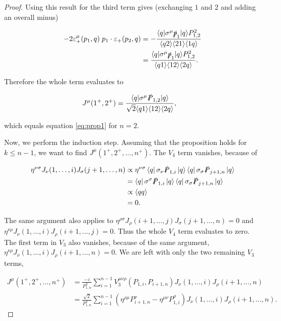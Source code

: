 \documentclass{article}
\theoremstyle{definition}
\numberwithin{equation}{section}
\begin{document}
\begin{proof}
    Using this result for the third term gives (exchanging $1$ and $2$ and adding an overall minus)

    \begin{align*}
        - 2 \varepsilon_{+}^{\mu}(p_1,q) \; p_1 \cdot \varepsilon_{+}(p_2,q) &= -\frac{\langle q | \sigma^{\mu} \slashed{p}_1 | q \rangle P_{1,2}^2}{\langle q2 \rangle \langle 21 \rangle \langle 1q \rangle} \\
        &= \frac{\langle q | \sigma^{\mu} \slashed{p}_1 | q \rangle P_{1,2}^2}{\langle q1 \rangle \langle 12 \rangle \langle 2q \rangle}.
    \end{align*}

    Therefore the whole term evaluates to

    \begin{align*}
        J^{\mu}(1^{+}, 2^{+}) &= \frac{ \langle q | \sigma^{\mu} \slashed{P}_{1,2} | q \rangle }{ \sqrt{2} \langle q1 \rangle \langle 12 \rangle \langle 2q \rangle },
    \end{align*}

    which equals equation \eqref{eq:prop1} for $n=2$.

    Now, we perform the induction step. Assuming that the proposition holds for $k \leq n-1$, we want to find $J^{\mu}(1^{+}, 2^{+}, \dots , n^{+})$. The $V_4$ term vanishes, because of

    \begin{align*}
        \eta^{\nu \sigma} J_{\nu}(1, \dots, i) J_{\sigma}(j+1, \dots, n)
        &\propto \eta^{\nu \sigma} \bra{q} \sigma_{\nu} \slashed{P}_{1,i} \ket{q} \bra{q} \sigma_{\sigma} \slashed{P}_{j+1,n} \ket{q} \\
        &= \bra{q} \sigma^{\sigma} \slashed{P}_{1,i} \ket{q} \bra{q} \sigma_{\sigma} \slashed{P}_{j+1,n} \ket{q} \\
        &\propto  \langle qq \rangle \\
        &= 0.
    \end{align*}

    The same argument also applies to $\eta^{\rho \sigma} J_{\rho}(i+1, \dots, j) J_{\sigma}(j+1, \dots, n) = 0$ and $\eta^{\nu \rho} J_{\nu}(1, \dots, i) J_{\rho}(i+1, \dots, j) = 0$. Thus the whole $V_4$ term evaluates to zero. The first term in $V_3$ also vanishes, because of the same argument, $\eta^{\nu \rho} J_{\nu}(1, \dots, i) J_{\rho}(i+1, \dots , n) = 0$. We are left with only the two remaining $V_3$ terms,

    \begin{align*}
        J^{\mu}(1^{+}, 2^{+}, \dots , n^{+}) &= \frac{-i}{P_{1,n}^2} \sum_{i=1}^{n-1} V_3^{\mu \nu \rho}(P_{1,i}, P_{i+1,n}) J_{\nu}(1, \dots, i) J_{\rho}(i+1, \dots , n) \\
        &= \frac{\sqrt{2}}{P_{1,n}^2} \sum_{i=1}^{n-1} \left( \eta^{\rho \mu} P_{i+1,n}^{\nu} - \eta^{\mu \nu} P_{1,i}^{\rho}  \right) J_{\nu}(1, \dots, i) J_{\rho}(i+1, \dots , n).
    \end{align*}


\end{proof}
\end{document}

